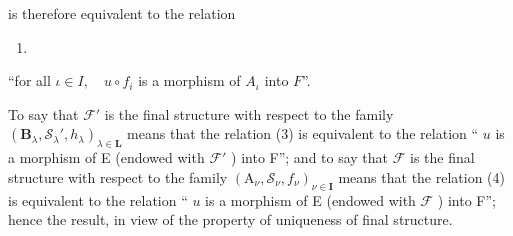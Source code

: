is therefore equivalent to the relation

\begin{enumerate}
\def\labelenumi{(\arabic{enumi})}
\setcounter{enumi}{3}
\tightlist
\item
\end{enumerate}

``for all \(\iota\in I,\quad u\circ f_{i}\) is a morphism of \(A_{\iota}\) into \(F\)''.

To say that \(\mathcal{F}'\) is the final structure with respect to the family \((\mathbf{B}_{\lambda},\mathcal{S}_{\lambda}',h_{\lambda})_{\lambda \in \mathbf{L}}\) means that the relation (3) is equivalent to the relation `` \(u\) is a morphism of E (endowed with \(\mathcal{F}'\) ) into F''; and to say that \(\mathcal{F}\) is the final structure with respect to the family \((\mathrm{A}_{\nu},\mathcal{S}_{\nu},f_{\nu})_{\nu \in \mathbf{I}}\) means that the relation (4) is equivalent to the relation `` \(u\) is a morphism of E (endowed with \(\mathcal{F}\) ) into F''; hence the result, in view of the property of uniqueness of final structure.

